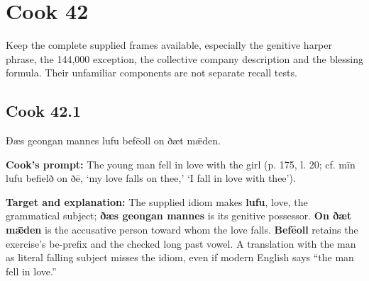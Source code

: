 \clearpage
\section*{Cook 42}

Keep the complete supplied frames available, especially the genitive harper phrase, the 144,000 exception, the collective company description and the blessing formula. Their unfamiliar components are not separate recall tests.

\par\begin{minipage}{\linewidth}\raggedright
\subsection*{Cook 42.1}

Ðæs geongan mannes lufu befēoll on ðæt mǣden.

\textbf{Cook's prompt:} The young man fell in love with the girl (p. 175, l. 20; cf. mīn lufu befielð on ðē, ‘my love falls on thee,’ ‘I fall in love with thee’).

\textbf{Target and explanation:} The supplied idiom makes \textbf{lufu}, love, the grammatical subject; \textbf{ðæs geongan mannes} is its genitive possessor. \textbf{On ðæt mǣden} is the accusative person toward whom the love falls. \textbf{Befēoll} retains the exercise's be-prefix and the checked long past vowel. A translation with the man as literal falling subject misses the idiom, even if modern English says “the man fell in love.”

\end{minipage}\par\addvspace{4pt}

